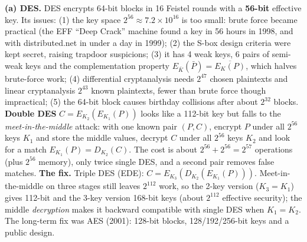 \textbf{(a) DES.} DES encrypts 64-bit blocks in 16 Feistel rounds with a \textbf{56-bit} effective key. Its issues: (1) the key space $2^{56} \approx 7.2 \times 10^{16}$ is too small: brute force became practical (the EFF ``Deep Crack'' machine found a key in 56 hours in 1998, and with distributed.net in under a day in 1999); (2) the S-box design criteria were kept secret, raising trapdoor suspicions; (3) it has 4 weak keys, 6 pairs of semi-weak keys and the complementation property $E_{\bar K}(\bar P) = \overline{E_K(P)}$, which halves brute-force work; (4) differential cryptanalysis needs $2^{47}$ chosen plaintexts and linear cryptanalysis $2^{43}$ known plaintexts, fewer than brute force though impractical; (5) the 64-bit block causes birthday collisions after about $2^{32}$ blocks.
\textbf{Double DES} $C = E_{K_2}(E_{K_1}(P))$ looks like a 112-bit key but falls to the \emph{meet-in-the-middle} attack: with one known pair $(P, C)$, encrypt $P$ under all $2^{56}$ keys $K_1$ and store the middle values, decrypt $C$ under all $2^{56}$ keys $K_2$ and look for a match $E_{K_1}(P) = D_{K_2}(C)$. The cost is about $2^{56} + 2^{56} = 2^{57}$ operations (plus $2^{56}$ memory), only twice single DES, and a second pair removes false matches.
\textbf{The fix.} Triple DES (EDE): $C = E_{K_3}(D_{K_2}(E_{K_1}(P)))$. Meet-in-the-middle on three stages still leaves $2^{112}$ work, so the 2-key version ($K_3 = K_1$) gives 112-bit and the 3-key version 168-bit keys (about $2^{112}$ effective security); the middle \emph{decryption} makes it backward compatible with single DES when $K_1 = K_2$. The long-term fix was AES (2001): 128-bit blocks, 128/192/256-bit keys and a public design.

